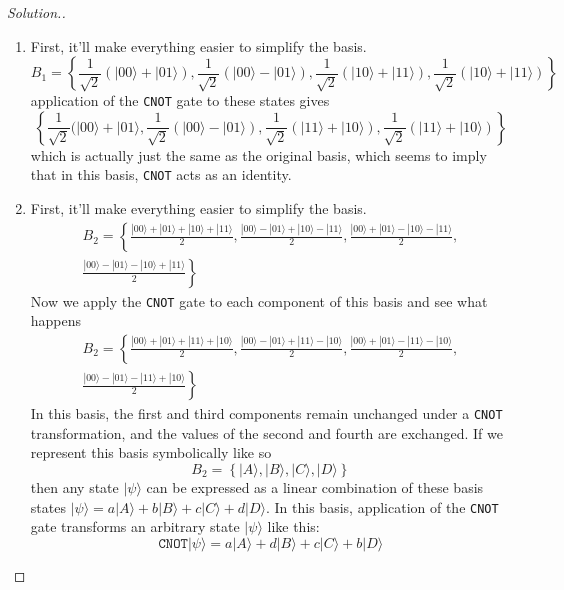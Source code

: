 \documentclass[12pt]{article}
\begin{document}
\begin{proof}[Solution.]~\\
\begin{enumerate}[label=(\alph*)]
\item First, it'll make everything easier to simplify the basis.
$$B_1=\left\lbrace\frac{1}{\sqrt{2}}\left(|00\rangle+|01\rangle\right),\frac{1}{\sqrt{2}}\left(|00\rangle-|01\rangle\right),\frac{1}{\sqrt{2}}\left(|10\rangle+|11\rangle\right),\frac{1}{\sqrt{2}}\left(|10\rangle+|11\rangle\right)\right\rbrace$$
application of the \texttt{CNOT} gate to these states gives
$$\left\lbrace\frac{1}{\sqrt{2}}(|00\rangle+|01\rangle, \frac{1}{\sqrt{2}}\left(|00\rangle-|01\rangle\right),\frac{1}{\sqrt{2}}\left(|11\rangle+|10\rangle\right),\frac{1}{\sqrt{2}}\left(|11\rangle+|10\rangle\right)\right\rbrace$$
which is actually just the same as the original basis, which seems to imply that in this basis, \texttt{CNOT} acts as
an identity.
\item First, it'll make everything easier to simplify the basis.
\begin{multline}
B_2=\left\lbrace\frac{|00\rangle+|01\rangle+|10\rangle+|11\rangle}{2}, \frac{|00\rangle-|01\rangle+|10\rangle-|11\rangle}{2}, \frac{|00\rangle+|01\rangle-|10\rangle-|11\rangle}{2},\right. \\ \left. \frac{|00\rangle-|01\rangle-|10\rangle+|11\rangle}{2}\right\rbrace
\end{multline}
Now we apply the \texttt{CNOT} gate to each component of this basis and see what happens
\begin{multline}
B_2=\left\lbrace\frac{|00\rangle+|01\rangle+|11\rangle+|10\rangle}{2}, \frac{|00\rangle-|01\rangle+|11\rangle-|10\rangle}{2}, \frac{|00\rangle+|01\rangle-|11\rangle-|10\rangle}{2},\right. \\ \left. \frac{|00\rangle-|01\rangle-|11\rangle+|10\rangle}{2}\right\rbrace
\end{multline}
In this basis, the first and third components remain unchanged under a \texttt{CNOT} transformation, and the values
of the second and fourth are exchanged. If we represent this basis symbolically like so
$$B_2=\left\lbrace|A\rangle, |B\rangle, |C\rangle, |D\rangle\right\rbrace$$
then any state $|\psi\rangle$ can be expressed as a linear combination of these basis states
$|\psi\rangle=a|A\rangle+b|B\rangle+c|C\rangle+d|D\rangle$. In this basis, application of the \texttt{CNOT} gate
transforms an arbitrary state $|\psi\rangle$ like this:
$$\texttt{CNOT}|\psi\rangle=a|A\rangle+d|B\rangle+c|C\rangle+b|D\rangle$$
\end{enumerate}
\end{proof}
\end{document}
